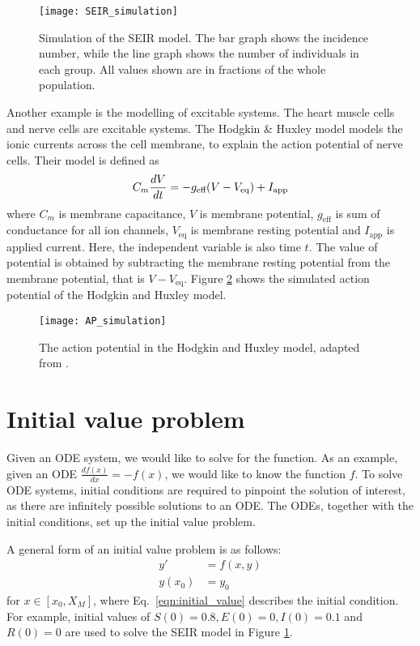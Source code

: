 \begin{figure}
    \texttt{[image: SEIR\_simulation]}
    \caption{Simulation of the SEIR model. The bar graph shows the incidence number, while the line graph shows the number of individuals in each group. All values shown are in fractions of the whole population.}
    \label{fig:SEIR_simulation}
\end{figure}

Another example is the modelling of excitable systems. The heart muscle cells and nerve cells are excitable systems. The Hodgkin \& Huxley model models the ionic currents across the cell membrane, to explain the action potential of nerve cells\cite{Keener2009}.
Their model is defined as
\begin{equation}
\label{model:HH}
    C_m \frac{dV}{dt} = -g_{\text{eff}}(V - V_{\text{eq}}) + I_{\text{app}} \\
\end{equation}
where $C_m$ is membrane capacitance, $V$ is membrane potential, $g_{\text{eff}}$ is sum of conductance for all ion channels, $V_{\text{eq}}$ is membrane resting potential and $I_{\text{app}}$ is applied current. Here, the independent variable is also time $t$. The value of potential is obtained by subtracting the membrane resting potential from the membrane potential, that is $V - V_{\text{eq}}$. Figure \ref{fig:AP_simulation} shows the simulated action potential of the Hodgkin and Huxley model. 

\begin{figure}
\centering
    \texttt{[image: AP\_simulation]}
    \caption{The action potential in the Hodgkin and Huxley model, adapted from \cite{Keener2009}.}
    \label{fig:AP_simulation}
\end{figure}

\section{Initial value problem}
Given an ODE system, we would like to solve for the function. As an example, given an ODE $\frac{df(x)}{dx} = -f(x)$, we would like to know the function $f$. To solve ODE systems, initial conditions are required to pinpoint the solution of interest, as there are infinitely possible solutions to an ODE. The ODEs, together with the initial conditions, set up the initial value problem.

A general form of an initial value problem is as follows: 
\begin{align}
\label{eqn:initial_value_start}
    y'&=f(x,y)\\
    y(x_0) &= y_0 \label{eqn:initial_value}
\end{align}
for $x \in [x_0, X_M]$, where Eq.~\eqref{eqn:initial_value} describes the initial condition. For example, initial values of $S(0)=0.8, E(0)=0, I(0)=0.1$ and $R(0)=0$ are used to solve the SEIR model in Figure \ref{fig:SEIR_simulation}.

